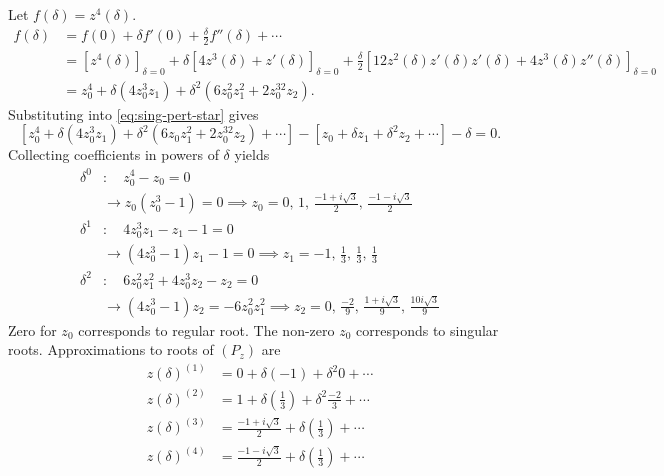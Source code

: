 \documentclass[12pt,twoside]{article}
\begin{document}
Let $f(\delta) = z^4(\delta)$.
\begin{equation*}
  \begin{aligned}
    f(\delta) &= f(0) + \delta f'(0) + \frac{\delta}{2}f''(\delta) + \cdots \\
    &= \left[ z^4(\delta) \right]_{\delta=0} + \delta \left[
      4z^3(\delta)+z'(\delta) \right]_{\delta=0} + \frac{\delta}{2}\left[
      12z^2(\delta)z'(\delta)z'(\delta) + 4z^3(\delta)z''(\delta)
    \right]_{\delta=0} \\
    &= z_0^4+\delta(4z_0^3z_1) + \delta^2(6z_0^2z_1^2+2z_0^32z_2).
  \end{aligned}
\end{equation*}
Substituting into \cref{eq:sing-pert-star} gives
\begin{equation*}
  \left[ z_0^4+\delta(4z_0^3z_1) + \delta^2(6z_0z_1^2+2z_0^32z_2) + \cdots \right]
  -\left[ z_0 + \delta z_1 + \delta^2 z_2 + \cdots \right]
  -\delta = 0.
\end{equation*}
Collecting coefficients in powers of $\delta$ yields
\begin{equation*}
  \begin{aligned}
    \delta^0 &:\quad z_0^4-z_0=0
    \\ &\rightarrow z_0(z_0^3-1)=0
    \implies z_0=0,\,1,\,\frac{-1+i\sqrt{3}}{2},\,\frac{-1-i\sqrt{3}}{2} \\
    \delta^1 &:\quad 4z_0^3z_1 - z_1-1=0
    \\ &\rightarrow (4z_0^3-1)z_1-1=0
    \implies z_1=-1,\,\frac{1}{3},\,\frac{1}{3},\,\frac{1}{3} \\
    \delta^2 &:\quad 6z_0^2z_1^2+4z_0^3z_2-z_2=0
    \\ &\rightarrow (4z_0^3-1)z_2=-6z_0^2z_1^2
    \implies z_2=0,\,\frac{-2}{9},\,\frac{1+i\sqrt{3}}{9},\,\frac{10i\sqrt{3}}{9}
  \end{aligned}
\end{equation*}
Zero for $z_0$ corresponds to regular root. The non-zero $z_0$ corresponds to
singular roots. Approximations to roots of $(P_z)$ are
\begin{equation*}
  \begin{aligned}
    z(\delta)^{(1)} &= 0 + \delta(-1) + \delta^2{0} + \cdots \\
    z(\delta)^{(2)} &= 1 + \delta\left(\frac{1}{3}\right) + \delta^2{\frac{-2}{3}} + \cdots \\
    z(\delta)^{(3)} &= \frac{-1+i\sqrt{3}}{2} + \delta\left( \frac{1}{3} \right) + \cdots \\
    z(\delta)^{(4)} &= \frac{-1-i\sqrt{3}}{2} + \delta\left( \frac{1}{3} \right) + \cdots \\
  \end{aligned}
\end{equation*}
\end{document}
